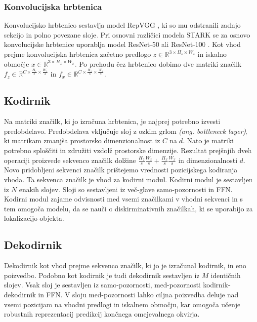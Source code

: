 \documentclass[a4paper,12pt,openright]{book}
\begin{document}
\subsubsection{Konvolucijska hrbtenica}
Konvolucijsko hrbtenico sestavlja model RepVGG \cite{repvgg}, ki so mu odstranili zadnjo sekcijo in polno povezane sloje. Pri osnovni različici modela STARK se za osnovo konvolucijske hrbtenice uporablja model ResNet-50 ali ResNet-100 \cite{resnet}. Kot vhod prejme konvolucijska hrbtenica začetno predlogo $ z \in \mathbb{R}^{3 \times H_z \times W_z} $ in iskalno območje $ x \in \mathbb{R}^{3 \times H_x \times W_x} $. Po prehodu čez hrbtenico dobimo dve matriki značilk
$ f_z \in \mathbb{R}^{C \times \frac{H_z}{s} \times \frac{W_z}{s}} $ in $ f_x \in \mathbb{R}^{C \times \frac{H_x}{s} \times \frac{W_x}{s}} $.

\subsection{Kodirnik}
Na matriki značilk, ki jo izračuna hrbtenica, je najprej potrebno izvesti predobdelavo. Predobdelava vključuje sloj z ozkim grlom \emph{(ang. bottleneck layer)}, ki matrikam zmanjša prostorsko dimenzionalnost iz $ C $ na $ d $. Nato je matriki potrebno sploščiti in združiti vzdolž prostorske dimenzije. Rezultat prejšnjih dveh operaciji proizvede sekvenco značilk dolžine $ \frac{H_z}{s}\frac{W_z}{s} + \frac{H_x}{s}\frac{W_x}{s} $ in dimenzionalnosti $ d $. Novo pridobljeni sekvenci značilk prištejemo vrednosti pozicijskega kodiranja vhoda. Ta sekvenca značilk je vhod za kodirni modul. Kodirni modul je sestavljen iz $ N $ enakih slojev. Sloji so sestavljeni iz več-glave samo-pozornosti in FFN. Kodirni modul zajame odvisnosti med vsemi značilkami v vhodni sekvenci in s tem omogoča modelu, da se nauči o diskirminativnih značilkah, ki se uporabijo za lokalizacijo objekta.

\subsection{Dekodirnik}
Dekodirnik kot vhod prejme sekvenco značilk, ki jo je izračunal kodirnik, in eno poizvedbo. Podobno kot kodirnik je tudi dekodirnik sestavljen iz $ M $ identičnih slojev. Vsak sloj je sestavljen iz samo-pozornosti, med-pozornosti kodirnik-dekodirnik in FFN. V sloju med-pozornosti lahko ciljna poizvedba deluje nad vsemi pozicijam na vhodni predlogi in iskalnem območju, kar omogoča učenje robustnih reprezentacij predikcij končnega omejevalnega ok\-virja.
\end{document}

